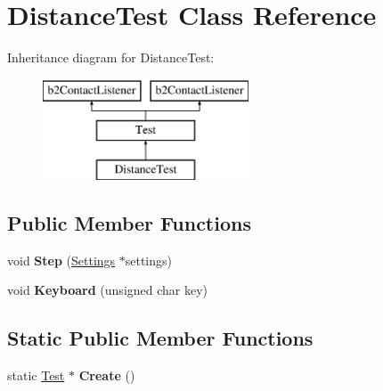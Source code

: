 \hypertarget{class_distance_test}{\section{Distance\-Test Class Reference}
\label{class_distance_test}
}
Inheritance diagram for Distance\-Test\-:\begin{figure}[H]
\begin{center}
\leavevmode
\includegraphics[height=3.000000cm]{class_distance_test}
\end{center}
\end{figure}
\subsection*{Public Member Functions}
\begin{DoxyCompactItemize}
\item 
\hypertarget{class_distance_test_a32a0fc1ce1e527e78ed0c4d0de234186}{void {\bfseries Step} (\hyperlink{struct_settings}{Settings} $\ast$settings)}\label{class_distance_test_a32a0fc1ce1e527e78ed0c4d0de234186}

\item 
\hypertarget{class_distance_test_ae93d6b9dabab15949a16f83d69d6c98e}{void {\bfseries Keyboard} (unsigned char key)}\label{class_distance_test_ae93d6b9dabab15949a16f83d69d6c98e}

\end{DoxyCompactItemize}
\subsection*{Static Public Member Functions}
\begin{DoxyCompactItemize}
\item 
\hypertarget{class_distance_test_ac872ed2ac5b9be712583cd843ae97939}{static \hyperlink{class_test}{Test} $\ast$ {\bfseries Create} ()}\label{class_distance_test_ac872ed2ac5b9be712583cd843ae97939}

\end{DoxyCompactItemize}
